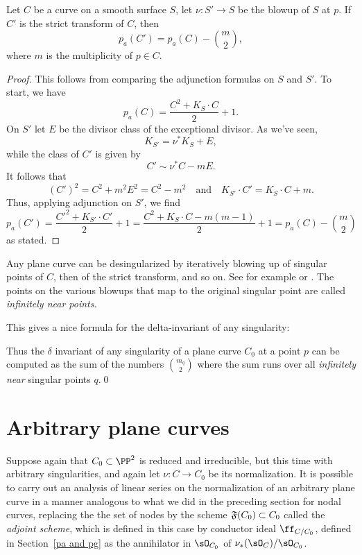 \begin{proposition}\label{effect of blowup on genus}
 Let $C$ be a curve on a smooth surface $S$, let $\nu : S' \to S$ be the blowup of $S$ at $p$. If $C'$ is the strict transform of $C$, then
 $$
 p_a(C') = p_a(C) -{m\choose 2},
 $$
 where $m$ is the multiplicity of $p\in C$.
\end{proposition}
\begin{proof}
This follows from comparing the adjunction formulas on $S$ and $S'$. To start, we have
$$
p_a(C) = \frac{C^2 + K_S\cdot C}{2} + 1.
$$
On $S'$ let $E$ be the divisor class of the exceptional divisor. As we've seen,
$$
K_{S'} = \nu^*K_S + E,
$$
while the class of $C'$ is given by
$$
C' \sim \nu^*C - mE.
$$
It follows that
$$
(C')^2 = C^2 + m^2E^2 = C^2 - m^2 \quad \text{and} \quad K_{S'}\cdot C' = K_S\cdot C + m.
$$
Thus, applying adjunction on $S'$, we find
$$
p_a(C') = \frac{{C'}^2 + K_{S'}\cdot C'}{2} + 1 = \frac{C^2 + K_S\cdot C - m(m-1)}{2} + 1 = p_a(C) -{m\choose 2}
$$
as stated.
\end{proof}

\begin{fact}
Any plane curve can be desingularized by
iteratively blowing up of singular points of $C$, then of the strict transform, and so on. See for example
\cite{Fulton1989}  or \cite{Brieskorn1986}. The points on the various blowups that
map to the original singular point are called \emph{infinitely near points}.
\end{fact}

This gives a nice formula for the delta-invariant of any singularity:

\begin{corollary}
\label{computing delta}

Thus the $\delta$ invariant of any singularity of a plane curve $C_{0}$ at a point $p$ can be computed as the sum of the numbers $\binom{m_{q}}{2}$
where the sum runs over all \emph{infinitely near} singular points $q$.\qed
\end{corollary}

\section{Arbitrary plane curves} \label{arbitrary plane curves}

Suppose again that $C_0 \subset \PP^2$ is reduced and irreducible, but  this time with arbitrary singularities, and again let $\nu : C \to C_0$ be its normalization. 
It is possible to carry out an analysis of linear series on the normalization of an arbitrary plane curve in a manner  analogous to what we did in the preceding section for nodal curves, replacing the the set of nodes by the scheme $\adj(C_{0})\subset C_{0}$ called the \emph{adjoint scheme}, which is defined in this case by conductor ideal $\ff_{C/C_0}$, defined in Section~\ref{pa and pg} 
as the annihilator in $\sO_{C_{0}}$ of $\nu_{*}(\sO_{C})/\sO_{C_{0}}$.


